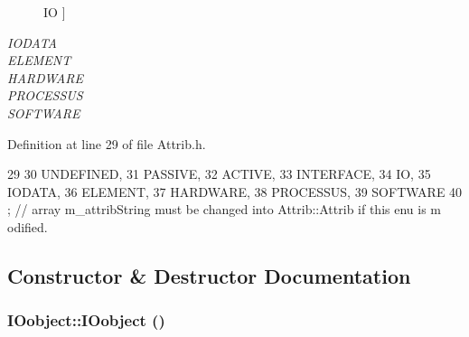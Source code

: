 \begin{Desc}
\begin{description}
{{IO}
\label{classAttrib_a69e171d7cc6417835a5a306d3c764235a1420a5b8c0540b2af210b6975eded7f9}
}]\item[{\em 
\hypertarget{classAttrib_a69e171d7cc6417835a5a306d3c764235a0af3b0d0ac323c1704e6c69cf90add28}{
IODATA}
\label{classAttrib_a69e171d7cc6417835a5a306d3c764235a0af3b0d0ac323c1704e6c69cf90add28}
}]\item[{\em 
\hypertarget{classAttrib_a69e171d7cc6417835a5a306d3c764235a7788bc5dd333fd8ce18562b269c9dab1}{
ELEMENT}
\label{classAttrib_a69e171d7cc6417835a5a306d3c764235a7788bc5dd333fd8ce18562b269c9dab1}
}]\item[{\em 
\hypertarget{classAttrib_a69e171d7cc6417835a5a306d3c764235a61ceb22149f365f1780d18f9d1459423}{
HARDWARE}
\label{classAttrib_a69e171d7cc6417835a5a306d3c764235a61ceb22149f365f1780d18f9d1459423}
}]\item[{\em 
\hypertarget{classAttrib_a69e171d7cc6417835a5a306d3c764235a75250e29692496e73effca2c0330977f}{
PROCESSUS}
\label{classAttrib_a69e171d7cc6417835a5a306d3c764235a75250e29692496e73effca2c0330977f}
}]\item[{\em 
\hypertarget{classAttrib_a69e171d7cc6417835a5a306d3c764235a103a67cd0b8f07ef478fa45d4356e27b}{
SOFTWARE}
\label{classAttrib_a69e171d7cc6417835a5a306d3c764235a103a67cd0b8f07ef478fa45d4356e27b}
}]\end{description}
\end{Desc}



Definition at line 29 of file Attrib.h.


\begin{DoxyCode}
29                 {
30     UNDEFINED,
31     PASSIVE,
32     ACTIVE,
33     INTERFACE,
34     IO,
35     IODATA,
36     ELEMENT,
37     HARDWARE,
38     PROCESSUS,
39     SOFTWARE 
40   }; // array m_attribString must be changed into Attrib::Attrib if this enu is m
      odified. 
\end{DoxyCode}


\subsection{Constructor \& Destructor Documentation}
\hypertarget{classIOobject_a0c3f5a9fcc09892e99a4c977f4318a0b}{
\subsubsection[{IOobject}]{\setlength{\rightskip}{0pt plus 5cm}IOobject::IOobject ()}}
\label{classIOobject_a0c3f5a9fcc09892e99a4c977f4318a0b}


